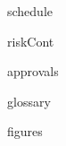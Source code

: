 \label{sec_schedule}

\downsection
  {schedule}
\upsection

\label{sec_riskCont}

\downsection
  {riskCont}
\upsection

\label{sec_approvals}

\downsection
  {approvals}
\upsection


\label{sec_glossary}

\downsection
  {glossary}
\upsection

\label{sec_glossary}

\downsection
  {figures}
\upsection
